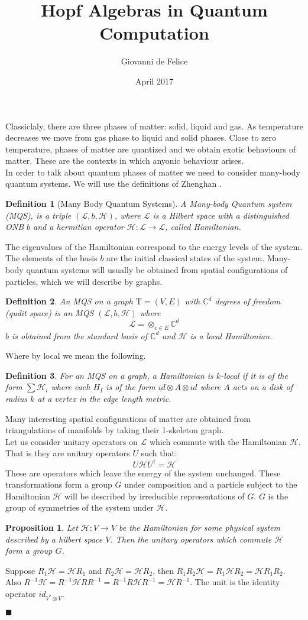 \documentclass{article}
\title{Hopf Algebras in Quantum Computation}
\author{Giovanni de Felice}
\date{April 2017}
\newtheorem{definition}{Definition}
\newtheorem{proposition}[theorem]{Proposition}
\newenvironment{proof}[1][Proof]{\begin{trivlist}
		\item[\hskip \labelsep {\bfseries #1}]}{\begin{flushright}$\blacksquare$\end{flushright} \end{trivlist}}
\newcommand{\Tau}{\mathrm{T}}
\newcommand{\ham}{\mathcal{H}}
\begin{document}
Classiclaly, there are three phases of matter: solid, liquid and gas. As temperature decreases we move from gas phase to liquid and solid phases. Close to zero temperature, phases of matter are quantized and we obtain exotic behaviours of matter. These are the contexts in which anyonic behaviour arises.\\
In order to talk about quantum phases of matter we need to consider many-body quantum systems. We will use the definitions of Zhenghan \cite{Rowell17}.

\begin{definition}[Many Body Quantum Systems]
	A Many-body Quantum system (MQS), is a triple $(\mathcal{L}, b, \mathcal{H})$, where $\mathcal{L}$ is a Hilbert space with a distinguished ONB $b$ and a hermitian operator $\mathcal{H}: \mathcal{L} \rightarrow \mathcal{L}$, called Hamiltonian.
\end{definition}
The eigenvalues of the Hamiltonian correspond to the energy levels of the system. The elements of the basis $b$ are the initial classical states of the system. Many-body quantum systems will usually be obtained from spatial configurations of particles, which we will describe by graphs.
\begin{definition}
	An MQS on a graph $\Tau = (V,E)$ with $\mathbb{C}^d$ degrees of freedom (qudit space) is an MQS $(\mathcal{L},b, \mathcal{H})$ where
	$$ \mathcal{L} = \otimes_{e\in E} \mathbb{C}^d$$
	$b$ is obtained from the standard basis of $\mathbb{C}^d$ and $\mathcal{H}$ is a local Hamiltonian.
\end{definition}
Where by local we mean the following.
\begin{definition}
	For an MQS on a graph, a Hamiltonian is $k$-local if it is of the form $\sum \mathcal{H}_i$ where each $H_I$ is of the form $id \otimes A \otimes id$ where $A$ acts on a disk of radius $k$ at a vertex in the edge length metric.
\end{definition}
Many interesting spatial configurations of matter are obtained from triangulations of manifolds by taking their 1-skeleton graph.\\
Let us consider unitary operators on $\mathcal{L}$ which commute with the Hamiltonian $\mathcal{H}$. That is they are unitary operators $U$ such that:
$$ U \ham U^\dagger = \ham$$
These are operators which leave the energy of the system unchanged. These transformations form a group $G$ under composition and a particle subject to the Hamiltonian $\mathcal{H}$ will be described by irreducible representations of $G$. $G$ is the group of symmetries of the system under $\mathcal{H}$.
\begin{proposition}
	Let $\mathcal{H}:V\rightarrow V$ be the Hamiltonian for some physical system described by a hilbert space $V$. Then the unitary operators which commute $\mathcal{H}$ form a group $G$.
\end{proposition}
\begin{proof}
	Suppose $R_1\ham=\ham R_1$ and $R_2\ham=\ham R_2$, then $R_1R_2\ham=R_1\ham R_2 = \ham R_1R_2$. Also $R^{-1}\ham = R^{-1}\ham RR^{-1} = R^{-1}R\ham R^{-1} =\ham R^{-1}$. The unit is the identity operator $id_{V^*\otimes V}$.
\end{proof}
\end{document}
